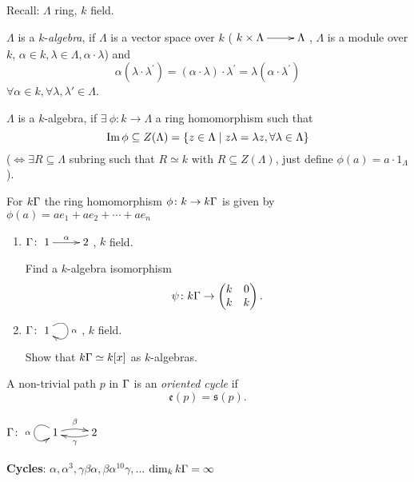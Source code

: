Recall: $\Lambda$ ring, $k$ field. 
\begin{defin}
  $\Lambda$ is a $k$-\emph{algebra}, if $\Lambda$ is a
  vector space over $k$ ($\xymatrix{k\times\Lambda \ar[r] & \Lambda}$,
  $\Lambda$ is a module over $k$,
  $\alpha \in k, \lambda \in \Lambda, \alpha\cdot\lambda$) and
\[\alpha(\lambda\cdot\lambda^{'})=(\alpha\cdot\lambda)\cdot\lambda^{'}
  = \lambda(\alpha\cdot\lambda^{'})\]
  $\forall \alpha \in k, \forall \lambda,
  \lambda'\in\Lambda$. 
	
\begin{note}
  $\Lambda$ is a $k$-algebra, if $\exists\ \phi\colon k \to \Lambda$ a
  ring homomorphism such that
 \[\operatorname{Im}\nolimits\phi \subseteq Z(\Lambda)= \{z\in \Lambda \mid 
  z\lambda=\lambda z,\forall \lambda \in \Lambda\}\]
  ($\iff \exists R \subseteq \Lambda$ subring such that $R \simeq k$
  with $R \subseteq Z(\Lambda)$, just define $\phi (a)=a \cdot
  1_{\Lambda}$). 
\end{note}
  For $ k\Gamma $ the ring homomorphism $\phi \colon k \rightarrow k\Gamma $
  is given by $\phi(a) = ae_1 + ae_2 + \cdots + ae_n$
\end{defin}
\begin{exer}
\begin{enumerate}
\item $\Gamma\colon \xymatrix{1\ar[r]^\alpha & 2}$, $k$ field. 

Find a $k$-algebra isomorphism
\[\psi\colon k\Gamma \rightarrow \begin{pmatrix}
    k & 0\\
    k & k
  \end{pmatrix}.\]
\item $\G\colon \xymatrix{1\ar@(ur,dr)[]^\alpha}$,  $k$ field.

Show that $k\Gamma\simeq k[x]$ as $k$-algebras.
\end{enumerate}
\end{exer}

\begin{defin}
  A non-trivial path $p$ in $\Gamma$ is an \emph{oriented
    cycle} if
  \[\mathfrak{e}(p) = \mathfrak{s}(p).\]
\end{defin}

\begin{exam}
  $\G\colon \xymatrix{\ar@(ul,dl)[]_\alpha 1 \ar@/^.3pc/[r]^\beta &
    \ar@/^.3pc/[l]^\gamma 2}$\\ \newline 

\textbf{Cycles}:
  $\alpha,\alpha^3,\gamma\beta\alpha,\beta\alpha^{10}\gamma, \ldots$
  $\dim_k k\Gamma = \infty$
\end{exam}

